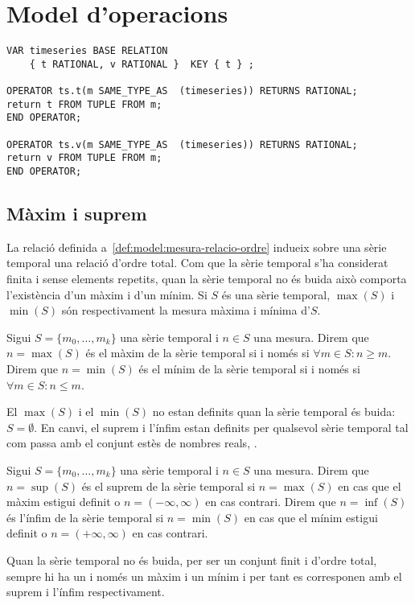 \section{Model d'operacions}



\begin{verbatim}
VAR timeseries BASE RELATION
    { t RATIONAL, v RATIONAL }  KEY { t } ;

OPERATOR ts.t(m SAME_TYPE_AS  (timeseries)) RETURNS RATIONAL;
return t FROM TUPLE FROM m;
END OPERATOR;

OPERATOR ts.v(m SAME_TYPE_AS  (timeseries)) RETURNS RATIONAL;
return v FROM TUPLE FROM m;
END OPERATOR;
\end{verbatim}




\subsection{Màxim i suprem}


La relació definida a~\ref{def:model:mesura-relacio-ordre} indueix
sobre una sèrie temporal una relació d'ordre total. Com que la sèrie
temporal s'ha considerat finita i sense elements repetits, quan la
sèrie temporal no és buida això comporta l'existència d'un màxim i
d'un mínim.  Si $S$ és una sèrie temporal, $\max(S)$ i $\min(S)$ són
respectivament la mesura màxima i mínima d'$S$.

\begin{definition}
  Sigui $S=\{m_0,\ldots,m_k\}$ una sèrie temporal i $n\in S$ una
  mesura.  Direm que $n=\max(S)$ és el màxim de la sèrie temporal si i
  només si $\forall m \in S: n \geq m $.  Direm que $n=\min(S)$ és el
  mínim de la sèrie temporal si i només si $\forall m \in S: n \leq
  m$.
\end{definition}

El $\max(S)$ i el $\min(S)$ no estan definits quan la sèrie temporal
és buida: $S= \emptyset$. En
canvi, el suprem i l'ínfim estan definits per qualsevol
sèrie temporal tal com passa amb el conjunt estès de nombres reals,
\cite{cantrell:extendedreal}.  

\begin{definition}
  Sigui $S=\{m_0,\ldots,m_k\}$ una sèrie temporal i $n\in S$ una
  mesura.  Direm que $n=\sup(S)$ és el suprem de la sèrie temporal si
  $n=\max(S)$ en cas que el màxim estigui definit o
  $n=(-\infty,\infty)$ en cas contrari.  Direm que $n=\inf(S)$ és
  l'ínfim de la sèrie temporal si $n=\min(S)$ en cas que el mínim
  estigui definit o $n=(+\infty,\infty)$ en cas contrari.
\end{definition}
Quan la sèrie temporal no és buida, per
ser un conjunt finit i d'ordre total, sempre hi ha un i només un màxim
i un mínim i per tant es corresponen amb el suprem i l'ínfim
respectivament.



